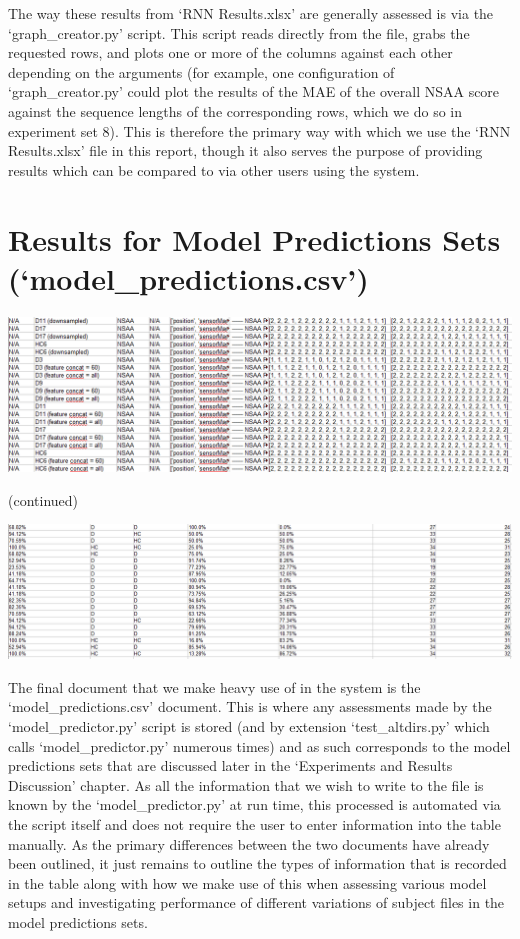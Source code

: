 \documentclass[12pt,twoside]{report}
\begin{document}
\quad The way these results from ‘RNN Results.xlsx’ are generally assessed is via the ‘graph\_creator.py’ script. This script reads directly from the file, grabs the requested rows, and plots one or more of the columns against each other depending on the arguments (for example, one configuration of ‘graph\_creator.py’ could plot the results of the MAE of the overall NSAA score against the sequence lengths of the corresponding rows, which we do so in experiment set 8). This is therefore the primary way with which we use the ‘RNN Results.xlsx’ file in this report, though it also serves the purpose of providing results which can be compared to via other users using the system.


\section{Results for Model Predictions Sets (‘model\_predictions.csv’)}

\begin{center}
\includegraphics[scale=0.4]{project_figures/fig7_5}
\end{center}
\begin{center}
(continued)
\end{center}
\begin{center}
\includegraphics[scale=0.4]{project_figures/fig7_6}
\end{center}

\quad The final document that we make heavy use of in the system is the ‘model\_predictions.csv’ document. This is where any assessments made by the ‘model\_predictor.py’ script is stored (and by extension ‘test\_altdirs.py’ which calls ‘model\_predictor.py’ numerous times) and as such corresponds to the model predictions sets that are discussed later in the ‘Experiments and Results Discussion’ chapter. As all the information that we wish to write to the file is known by the ‘model\_predictor.py’ at run time, this processed is automated via the script itself and does not require the user to enter information into the table manually. As the primary differences between the two documents have already been outlined, it just remains to outline the types of information that is recorded in the table along with how we make use of this when assessing various model setups and investigating performance of different variations of subject files in the model predictions sets.\\
\end{document}
